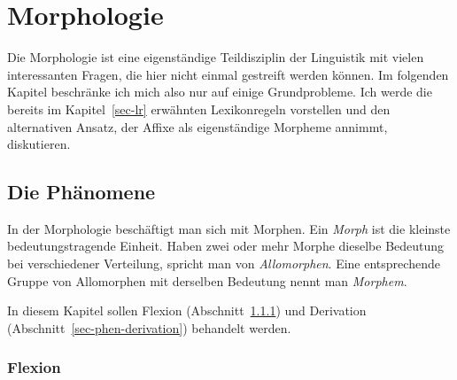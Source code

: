 


\chapter{Morphologie}
\label{Kapitel-morphologie}
\label{Kapitel-Morphologie}

Die Morphologie ist eine eigenständige Teildisziplin der Linguistik mit vielen interessanten
Fragen, die hier nicht einmal gestreift werden können. Im folgenden Kapitel beschränke ich
mich also nur auf einige Grundprobleme. Ich werde die bereits im Kapitel~\ref{sec-lr}
erwähnten Lexikonregeln vorstellen und den alternativen Ansatz, der Affixe als eigenständige
Morpheme annimmt, diskutieren.


\section{Die Phänomene}

In der Morphologie beschäftigt man sich mit Morphen. Ein \emph{Morph} ist
die kleinste bedeutungstragende Einheit. Haben zwei oder mehr Morphe dieselbe Bedeutung
bei verschiedener Verteilung, spricht man von \emph{Allomorphen}. Eine entsprechende Gruppe
von Allomorphen mit derselben Bedeutung nennt man \emph{Morphem}. 

In diesem Kapitel sollen Flexion (Abschnitt~\ref{sec-phen-flexion})
und Derivation (Abschnitt~\ref{sec-phen-derivation}) behandelt werden.

\subsection{Flexion}
\label{sec-phen-flexion}


